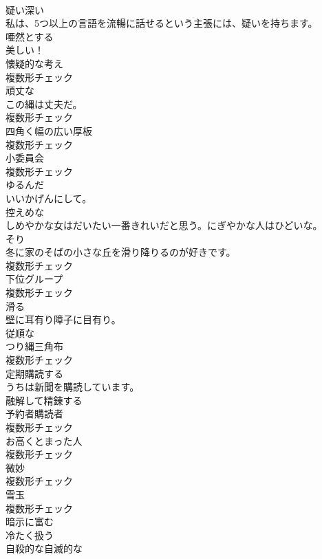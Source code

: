\documentclass[8pt]{extreport}
\begin{document}
\begin{CJK}{UTF8}{min}
\\	[形容詞]	疑い深い	
\\	私は、5つ以上の言語を流暢に話せるという主張には、疑いを持ちます。	
\\	[動詞]	唖然とする	
\\	美しい！	
\\	[名詞]	懐疑的な考え	
\\	複数形チェック
\\	[名詞]	頑丈な	
\\	この縄は丈夫だ。	
\\	複数形チェック
\\	[名詞]	四角く幅の広い厚板	
\\	複数形チェック
\\	[名詞]	小委員会	
\\	複数形チェック
\\	[形容詞]	ゆるんだ	
\\	いいかげんにして。	
\\	[形容詞]	控えめな	
\\	しめやかな女はだいたい一番きれいだと思う。にぎやかな人はひどいな。	
\\	[名詞]	そり	
\\	冬に家のそばの小さな丘を滑り降りるのが好きです。	
\\	複数形チェック
\\	[名詞]	下位グループ	
\\	複数形チェック
\\	[形容詞]	滑る	
\\	壁に耳有り障子に目有り。	
\\	[形容詞]	従順な	
\\	[名詞]	つり縄三角布	
\\	複数形チェック
\\	[動詞]	定期購読する	
\\	うちは新聞を購読しています。	
\\	[動詞]	融解して精錬する	
\\	[名詞]	予約者購読者	
\\	複数形チェック
\\	[名詞]	お高くとまった人	
\\	複数形チェック
\\	[名詞]	微妙	
\\	複数形チェック
\\	[名詞]	雪玉	
\\	複数形チェック
\\	[形容詞]	暗示に富む	
\\	[動詞]	冷たく扱う	
\\	[形容詞]	自殺的な自滅的な	

\end{CJK}
\end{document}
